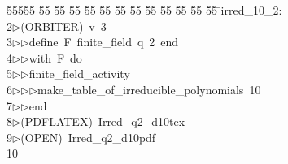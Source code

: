 %
%
\begin{tabbing}
55555 \= 55 \= 55 \= 55 \= 55 \= 55 \= 55 \= 55 \= 55 \= 55 \= 55 \= 55 \= 55 \= \>irred\_10\_2:\\[0pt]
2\>$\triangleright$\>(ORBITER)\ v\ 3\ \\[0pt]
3\>$\triangleright$\>$\triangleright$\>define\ F\ finite\_field\ q\ 2\ end\ \\[0pt]
4\>$\triangleright$\>$\triangleright$\>with\ F\ do\ \\[0pt]
5\>$\triangleright$\>$\triangleright$\>finite\_field\_activity\ \\[0pt]
6\>$\triangleright$\>$\triangleright$\>$\triangleright$\>make\_table\_of\_irreducible\_polynomials\ 10\ \\[0pt]
7\>$\triangleright$\>$\triangleright$\>end\\[0pt]
8\>$\triangleright$\>(PDFLATEX)\ Irred\_q2\_d10tex\\[0pt]
9\>$\triangleright$\>(OPEN)\ Irred\_q2\_d10pdf\\[0pt]
10\>\end{tabbing}
